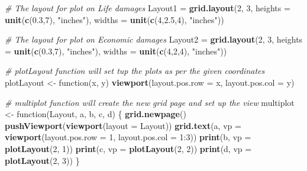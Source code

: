 \documentclass[]{article}
\newenvironment{Shaded}{\begin{snugshade}}{\end{snugshade}}
\newcommand{\KeywordTok}[1]{\textcolor[rgb]{0.13,0.29,0.53}{\textbf{{#1}}}}
\newcommand{\DataTypeTok}[1]{\textcolor[rgb]{0.13,0.29,0.53}{{#1}}}
\newcommand{\DecValTok}[1]{\textcolor[rgb]{0.00,0.00,0.81}{{#1}}}
\newcommand{\FloatTok}[1]{\textcolor[rgb]{0.00,0.00,0.81}{{#1}}}
\newcommand{\StringTok}[1]{\textcolor[rgb]{0.31,0.60,0.02}{{#1}}}
\newcommand{\CommentTok}[1]{\textcolor[rgb]{0.56,0.35,0.01}{\textit{{#1}}}}
\newcommand{\NormalTok}[1]{{#1}}
\begin{document}
\begin{Shaded}
\begin{Highlighting}[]
\CommentTok{# The layout for plot on Life damages}
\NormalTok{Layout1 =}\StringTok{ }\KeywordTok{grid.layout}\NormalTok{(}\DecValTok{2}\NormalTok{, }\DecValTok{3}\NormalTok{, }\DataTypeTok{heights =} \KeywordTok{unit}\NormalTok{(}\KeywordTok{c}\NormalTok{(}\FloatTok{0.3}\NormalTok{,}\DecValTok{7}\NormalTok{), }\StringTok{"inches"}\NormalTok{),}
                      \DataTypeTok{widths =} \KeywordTok{unit}\NormalTok{(}\KeywordTok{c}\NormalTok{(}\DecValTok{4}\NormalTok{,}\FloatTok{2.5}\NormalTok{,}\DecValTok{4}\NormalTok{), }\StringTok{"inches"}\NormalTok{))}

\CommentTok{# The layout for plot on Economic damages}
\NormalTok{Layout2 =}\StringTok{ }\KeywordTok{grid.layout}\NormalTok{(}\DecValTok{2}\NormalTok{, }\DecValTok{3}\NormalTok{, }\DataTypeTok{heights =} \KeywordTok{unit}\NormalTok{(}\KeywordTok{c}\NormalTok{(}\FloatTok{0.3}\NormalTok{,}\DecValTok{7}\NormalTok{), }\StringTok{"inches"}\NormalTok{), }
                      \DataTypeTok{widths =} \KeywordTok{unit}\NormalTok{(}\KeywordTok{c}\NormalTok{(}\DecValTok{4}\NormalTok{,}\DecValTok{2}\NormalTok{,}\DecValTok{4}\NormalTok{), }\StringTok{"inches"}\NormalTok{))}

\CommentTok{# plotLayout function will set tup the plots as per the given coordinates}
\NormalTok{plotLayout <-}\StringTok{ }\NormalTok{function(x, y) }\KeywordTok{viewport}\NormalTok{(}\DataTypeTok{layout.pos.row =} \NormalTok{x,}
                                   \DataTypeTok{layout.pos.col =} \NormalTok{y)}

\CommentTok{# multiplot function will create the new grid page and set up the view  }
\NormalTok{multiplot <-}\StringTok{ }\NormalTok{function(Layout, a, b, c, d) \{}
     \KeywordTok{grid.newpage}\NormalTok{()}
     \KeywordTok{pushViewport}\NormalTok{(}\KeywordTok{viewport}\NormalTok{(}\DataTypeTok{layout =} \NormalTok{Layout))}
     \KeywordTok{grid.text}\NormalTok{(a, }\DataTypeTok{vp =} \KeywordTok{viewport}\NormalTok{(}\DataTypeTok{layout.pos.row =} \DecValTok{1}\NormalTok{, }\DataTypeTok{layout.pos.col =} \DecValTok{1}\NormalTok{:}\DecValTok{3}\NormalTok{))}
     \KeywordTok{print}\NormalTok{(b, }\DataTypeTok{vp =} \KeywordTok{plotLayout}\NormalTok{(}\DecValTok{2}\NormalTok{, }\DecValTok{1}\NormalTok{))}
     \KeywordTok{print}\NormalTok{(c, }\DataTypeTok{vp =} \KeywordTok{plotLayout}\NormalTok{(}\DecValTok{2}\NormalTok{, }\DecValTok{2}\NormalTok{))}
     \KeywordTok{print}\NormalTok{(d, }\DataTypeTok{vp =} \KeywordTok{plotLayout}\NormalTok{(}\DecValTok{2}\NormalTok{, }\DecValTok{3}\NormalTok{))}
\NormalTok{\}}
\end{Highlighting}
\end{Shaded}
\end{document}
